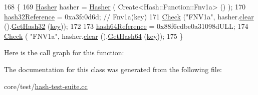 \begin{DoxyCode}
168 \{
169   \hyperlink{classns3_1_1Hasher}{Hasher} hasher = \hyperlink{classns3_1_1Hasher}{Hasher} ( Create<Hash::Function::Fnv1a> () );
170   \hyperlink{classHashTestCase_ae09d132ca1bd82e42b9beedbf98f9b45}{hash32Reference} = 0xa3fc0d6d;  \textcolor{comment}{// Fnv1a(key)}
171   \hyperlink{classHashTestCase_a798edd071714c5f3ff76a087622e097c}{Check} (\textcolor{stringliteral}{"FNV1a"}, hasher.\hyperlink{classns3_1_1Hasher_a629108aa89019d84af8b2d85c7185f54}{clear} ().\hyperlink{classns3_1_1Hasher_ae3508556dba4c2f4fc4901a059623117}{GetHash32} (\hyperlink{classHashTestCase_a955e1a4f01ad2ae6474e52e3bd403069}{key}));
172 
173   \hyperlink{classHashTestCase_a5e302abe033e775847dcf8856a94fea2}{hash64Reference} = 0x88f6cdbe0a31098dULL;
174   \hyperlink{classHashTestCase_a798edd071714c5f3ff76a087622e097c}{Check} ( \textcolor{stringliteral}{"FNV1a"}, hasher.\hyperlink{classns3_1_1Hasher_a629108aa89019d84af8b2d85c7185f54}{clear} ().\hyperlink{classns3_1_1Hasher_a88d83c8f9ae40f84df743b3efae2d9ce}{GetHash64} (\hyperlink{classHashTestCase_a955e1a4f01ad2ae6474e52e3bd403069}{key}));
175 \}
\end{DoxyCode}


Here is the call graph for this function\+:




The documentation for this class was generated from the following file\+:\begin{DoxyCompactItemize}
\item 
core/test/\hyperlink{hash-test-suite_8cc}{hash-\/test-\/suite.\+cc}\end{DoxyCompactItemize}
